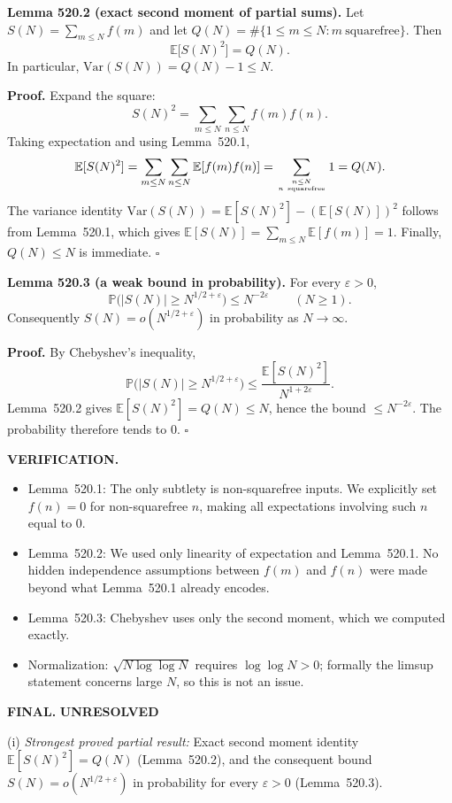 \medskip
\noindent\textbf{Lemma 520.2 (exact second moment of partial sums).}
Let $S(N)=\sum_{m\le N}f(m)$ and let $Q(N)=\#\{1\le m\le N: m\ \text{squarefree}\}$. Then
\[\mathbb E\big[S(N)^2\big] = Q(N).\]
In particular, $\mathrm{Var}(S(N))=Q(N)-1\le N$.

\noindent\textbf{Proof.}
Expand the square:
\[S(N)^2 = \sum_{m\le N}\sum_{n\le N} f(m)f(n).
\]
Taking expectation and using Lemma~520.1,
\[\mathbb E[S(N)^2]=\sum_{m\le N}\sum_{n\le N} \mathbb E[f(m)f(n)] = \sum_{n\le N\atop n\ \text{squarefree}} 1 = Q(N).
\]
The variance identity $\mathrm{Var}(S(N))=\mathbb E[S(N)^2]-(\mathbb E[S(N)])^2$ follows from Lemma~520.1, which gives $\mathbb E[S(N)]=\sum_{m\le N}\mathbb E[f(m)]=1$.
Finally, $Q(N)\le N$ is immediate.
\hfill$\square$

\medskip
\noindent\textbf{Lemma 520.3 (a weak bound in probability).}
For every $\varepsilon>0$,
\[\mathbb P\big(|S(N)|\ge N^{1/2+\varepsilon}\big) \le N^{-2\varepsilon}\qquad (N\ge 1).
\]
Consequently $S(N)=o(N^{1/2+\varepsilon})$ in probability as $N\to\infty$.

\noindent\textbf{Proof.}
By Chebyshev's inequality,
\[\mathbb P\big(|S(N)|\ge N^{1/2+\varepsilon}\big)\le \frac{\mathbb E[S(N)^2]}{N^{1+2\varepsilon}}.
\]
Lemma~520.2 gives $\mathbb E[S(N)^2]=Q(N)\le N$, hence the bound $\le N^{-2\varepsilon}$. The probability therefore tends to $0$.
\hfill$\square$

\bigskip
\noindent\textbf{VERIFICATION.}
\begin{itemize}
\item Lemma~520.1: The only subtlety is non-squarefree inputs. We explicitly set $f(n)=0$ for non-squarefree $n$, making all expectations involving such $n$ equal to $0$.
\item Lemma~520.2: We used only linearity of expectation and Lemma~520.1. No hidden independence assumptions between $f(m)$ and $f(n)$ were made beyond what Lemma~520.1 already encodes.
\item Lemma~520.3: Chebyshev uses only the second moment, which we computed exactly.
\item Normalization: $\sqrt{N\log\log N}$ requires $\log\log N>0$; formally the limsup statement concerns large $N$, so this is not an issue.
\end{itemize}

\bigskip
\noindent\textbf{FINAL.} \textbf{UNRESOLVED}

(i) \emph{Strongest proved partial result:}
Exact second moment identity $\mathbb E[S(N)^2]=Q(N)$ (Lemma~520.2), and the consequent bound $S(N)=o(N^{1/2+\varepsilon})$ in probability for every $\varepsilon>0$ (Lemma~520.3).

